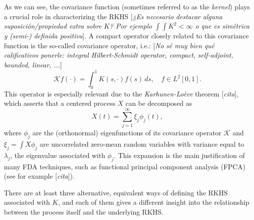 \documentclass[ba]{imsart}
\numberwithin{equation}{section}
\theoremstyle{plain}
\newcommand\incomment[1]{\color{red}[\textit{#1}]\color{black}}
\begin{document}
As we can see, the covariance function (sometimes referred to as the \textit{kernel}) plays a crucial role in characterizing the RKHS \incomment{¿Es necesario destacar alguna suposición/propiedad extra sobre \(K\)? Por ejemplo \(\int\int K^2 <\infty\) o que es simétrica y (semi-) definida positiva}. A compact operator closely related to this covariance function is the so-called covariance operator, i.e.: \incomment{No sé muy bien qué calificativos ponerle: integral Hilbert-Schmidt operator, compact, self-adjoint, bounded, linear, ...}
\[
\mathcal Kf(\cdot) = \int_0^1 K(s, \cdot)f(s)\, ds, \quad f \in L^2[0, 1].
\]
This operator is especially relevant due to the \textit{Karhunen-Loève} theorem \incomment{cita}, which asserts that a centered process \(X\) can be decomposed as
\begin{equation}\label{eq:karhunen-loeve}
X(t) = \sum_{j=1}^\infty \xi_j \phi_j(t),
\end{equation}
where \(\phi_j\) are the (orthonormal) eigenfunctions of its covariance operator \(\mathcal K\) and \(\xi_j = \int X\phi_j\) are uncorrelated zero-mean random variables with variance equal to \(\lambda_j\), the eigenvalue associated with \(\phi_j\). This expansion is the main justification of many FDA techniques, such as functional principal component analysis (FPCA) (see for example \incomment{cita}).

There are at least three alternative, equivalent ways of defining the RKHS associated with \(K\), and each of them gives a different insight into the relationship between the process itself and the underlying RKHS.
\end{document}
